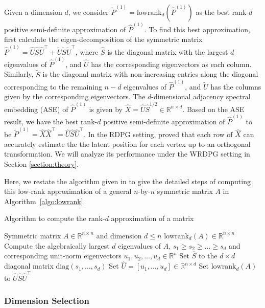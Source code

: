 \documentclass[a4paper]{article}
\renewcommand{\hat}{\widehat}
\renewcommand{\tilde}{\widetilde}
\begin{document}
Given a dimension $d$, we consider $\widetilde{P}^{(1)} = \mathrm{lowrank}_d(\hat{P}^{(1)})$ as the best rank-$d$ positive semi-definite approximation of $\hat{P}^{(1)}$. To find this best approximation, first calculate the eigen-decomposition of the symmetric matrix $\hat{P}^{(1)} = \hat{U} \hat{S} \hat{U}^{\top} + \widetilde{U} \widetilde{S} \widetilde{U}^{\top}$, where $\hat{S}$ is the diagonal matrix with the largest $d$ eigenvalues of $\hat{P}^{(1)}$, and $\hat{U}$ has the corresponding eigenvectors as each column. Similarly, $\tilde{S}$ is the diagonal matrix with non-increasing entries along the diagonal corresponding to the remaining $n - d$ eigenvalues of $\hat{P}^{(1)}$, and $\tilde{U}$ has the columns given by the corresponding eigenvectors.
The $d$-dimensional adjacency spectral embedding (ASE) of $\hat{P}^{(1)}$ is given by $\hat{X}=\hat{U} \hat{S}^{1/2}\in \mathbb{R}^{n \times d}$.
Based on the ASE result, we have the best rank-$d$ positive semi-definite approximation of $\hat{P}^{(1)}$ to be $\widetilde{P}^{(1)} = \hat{X} \hat{X}^{\top}=\hat{U}\hat{S}\hat{U}^{\top}$.
In the RDPG setting, \citet{sussman2014consistent} proved that each row of $\hat{X}$ can accurately estimate the the latent position for each vertex up to an orthogonal transformation. We will analyze its performance under the WRDPG setting in Section \ref{section:theory}.

Here, we restate the algorithm given in \citep{tang2016law} to give the detailed steps of computing this low-rank approximation of a general $n$-by-$n$ symmetric matrix $A$ in Algorithm~\ref{algo:lowrank}.
\begin{algorithm}[H]
\caption{Algorithm to compute the rank-$d$ approximation of a matrix}
\label{algo:lowrank}
\begin{algorithmic}[1]
\REQUIRE Symmetric matrix $A\in \mathbb{R}^{n \times n}$ and dimension $d\leq n$
\ENSURE $\mathrm{lowrank}_d(A)\in \mathbb{R}^{n \times n}$
\STATE Compute the algebraically largest $d$ eigenvalues of $A$, $s_1\geq s_2\ge \dotsc \ge s_d$ and corresponding unit-norm eigenvectors $u_1,u_2,\dotsc,u_d\in \mathbb{R}^n$
\STATE Set $\hat{S}$ to the $d\times d$ diagonal matrix $\mathrm{diag}(s_1,\dotsc,s_d)$
\STATE Set $\hat{U} = [u_1,\dotsc,u_d]\in \mathbb{R}^{n \times d}$
\STATE Set $\mathrm{lowrank}_d(A)$ to $\hat{U}\hat{S}\hat{U}^{\top}$
\end{algorithmic}
\end{algorithm}


\subsubsection{Dimension Selection}
\label{section:dim_select}
\end{document}
